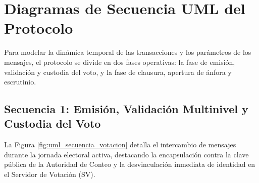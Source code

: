 \section{Diagramas de Secuencia UML del Protocolo}
\label{sec:diagramas_secuencia}

Para modelar la dinámica temporal de las transacciones y los parámetros de los mensajes, el protocolo se divide en dos fases operativas: la fase de emisión, validación y custodia del voto, y la fase de clausura, apertura de ánfora y escrutinio.

\subsection{Secuencia 1: Emisión, Validación Multinivel y Custodia del Voto}

La Figura \ref{fig:uml_secuencia_votacion} detalla el intercambio de mensajes durante la jornada electoral activa, destacando la encapsulación contra la clave pública de la Autoridad de Conteo y la desvinculación inmediata de identidad en el Servidor de Votación (SV).

